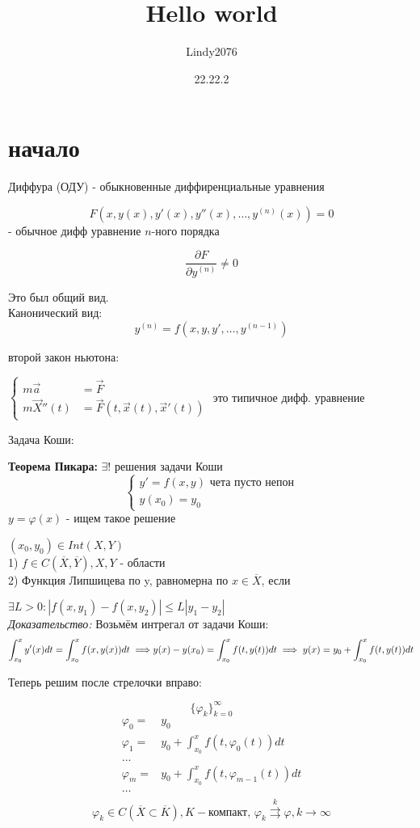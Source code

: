\documentclass[12pt, a4paper]{article}
\title{Hello world}
\author{Lindy2076}
\date{22.22.2} %
\begin{document}
\section{начало}

	Диффура (ОДУ) - обыкновенные диффиренциальные уравнения
	
	$$F(x, y(x), y'(x), y''(x), \dotsc, y^{(n)}(x)) = 0$$ - обычное дифф уравнение $n$-ного порядка
	
	$$\frac{\partial F}{\partial y^{(n)}} \neq 0$$

Это был общий вид.\\
Канонический вид:
$$y^{(n)} = f(x,y,y',\dotsc,y^{(n-1)})$$

второй закон ньютона: 

$\begin{cases}
m\vec{a} &= \vec{F} \\
m\vec{X}''(t) &= \vec{F}(t, \vec{x}(t), \vec{x}'(t))
\end{cases}$
это типичное дифф. уравнение

Задача Коши:



\textbf{Теорема Пикара:} $\exists!$ решения задачи Коши
$$\begin{cases}
	y' = f(x,y) \text{ чета пусто непон}\\
	y(x_0) = y_0
\end{cases}$$
$ y = \varphi(x)$ - ищем такое решение 

$(x_0, y_0) \in Int(X, Y)$\\
1) $f \in C(\overline{X}, \overline{Y}), X, Y$ - области \\
2) Функция Липшицева по y, равномерна по $x \in \overline{X}$, если

$\exists L>0: | f(x,y_1) - f(x,y_2)| \le L |y_1-y_2|$\\

\textit{Доказательство:}
Возьмём интрегал от задачи Коши:
$$\int^{x}_{x_0} y'(x) dt = \int^{x}_{x_0} f(x, y(x))dt \implies \\ y(x)-y(x_0) = \int^x_{x_0} f(t, y(t))dt \implies y(x) = y_0 + \int^x_{x_0}f(t,y(t))dt$$

Теперь решим после стрелочки вправо:

$$\{\varphi_k\}^\infty_{k=0}$$
$$
\begin{align}
\varphi_0 =& y_0 \\
\varphi_1 =& y_0 + \int^x_{x_0}f(t, \varphi_0(t))dt \\
\dotsc \\
\varphi_m =& y_0 + \int^x_{x_0}f(t, \varphi_{m-1}(t))dt \\
\dotsc \\
\end{align}$$
$$ \varphi_k \in C({\overline X \subset \overline K}), K - \text{компакт, } \varphi_k \overset{k}{\rightrightarrows } \varphi, k\to\infty
$$
\end{document}
